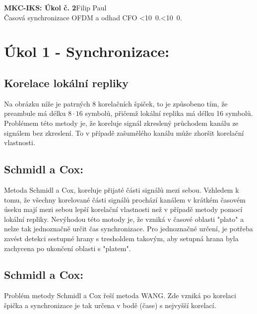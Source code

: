 \documentclass[10pt, a4paper]{article}%
\def\mydate{\leavevmode\hbox{\twodigits\day.\twodigits\month.\the\year}}
\def\twodigits#1{\ifnum#1<10 0\fi\the#1}
\begin{document}
\begin{flushleft}%
	\textbf{\Large{MKC-IKS: Úkol č. 2}}\hfill Filip Paul\\
	\large{Časová synchronizace OFDM a odhad CFO \hfill\mydate}
\end{flushleft}
	\section*{\Large Úkol 1 - Synchronizace:}
        \subsection*{Korelace lokální repliky}
        Na obrázku níže je patrných 8 korelačních špiček, to je způsobeno tím, že preambule má délku $8\cdot 16$ symbolů, přičemž
        lokální replika má délku 16 symbolů. Problémem této metody je, že koreluje signál zkreslený průchodem kanálu ze
        signálem bez zkreslení. To v případě zašumělého kanálu může zhoršit korelační vlastnosti.

        \subsection*{Schmidl a Cox:}
        Metoda Schmidl a Cox, koreluje přijaté části signálů mezi sebou. Vzhledem k tomu, že všechny korelované části signálů
        prochází kanálem v krátkém časovém úseku mají mezi sebou lepší korelační vlastnosti než v případě metody pomocí
        lokální repliky.
        Nevýhodou této motody je, že vzniká v časové oblasti "plato" a nelze tak jednoznačně určit čas synchronizace.
        Pro jednoznačné určení, je potřeba zavést detekci sestupné hrany s tresholdem takovým, aby setupná hrana byla zachycena
        po ukončení oblasti s "platem".

        \subsection*{Schmidl a Cox:}
        Problém metody Schmidl a Cox řeší metoda WANG. Zde vzniká po korelaci špička a synchronizace je tak určena v bodě (čase)
        s nejvyšší korelací.
\end{document}
